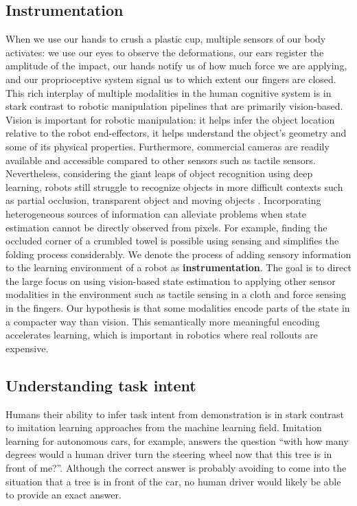 \documentclass[\home/main.tex]{subfiles}
\begin{document}
\subsection{Instrumentation}
When we use our hands to crush a plastic cup, multiple sensors of our body activates: we use our eyes to observe the deformations, our ears register the amplitude of the impact, our hands notify us of how much force we are applying, and our proprioceptive system signal us to which extent our fingers are closed. This rich interplay of multiple modalities in the human cognitive system is in stark contrast to robotic manipulation pipelines that are primarily vision-based. Vision is important for robotic manipulation: it helps infer the object location relative to the robot end-effectors, it helps understand the object's geometry and some of its physical properties. Furthermore, commercial cameras are readily available and accessible compared to other sensors such as tactile sensors. Nevertheless, considering the giant leaps of object recognition using deep learning, robots still struggle to recognize objects in more difficult contexts such as partial occlusion, transparent object and moving objects \autocite{Guo2014,sajjan2019cleargrasp,Ojha2015}.
Incorporating heterogeneous sources of information can alleviate problems when state estimation cannot be directly observed from pixels. For example, finding the occluded corner of a crumbled towel is possible using sensing and simplifies the folding process considerably.
We denote the process of adding sensory information to the learning environment of a robot as \textbf{instrumentation}. The goal is to direct the large focus on using vision-based state estimation to applying other sensor modalities in the environment such as tactile sensing in a cloth and force sensing in the fingers. Our hypothesis is that some modalities encode parts of the state in a compacter way than vision. This semantically more meaningful encoding accelerates learning, which is important in robotics where real rollouts are expensive.

\subsection{Understanding task intent}
Humans their ability to infer task intent from demonstration is in stark contrast to imitation learning approaches from the machine learning field. Imitation learning for autonomous cars, for example, answers the question \enquote{with how many degrees would a human driver turn the steering wheel now that this tree is in front of me?}. 
Although the correct answer is probably avoiding to come into the situation that a tree is in front of the car, no human driver would likely be able to provide an exact answer.
\end{document}
